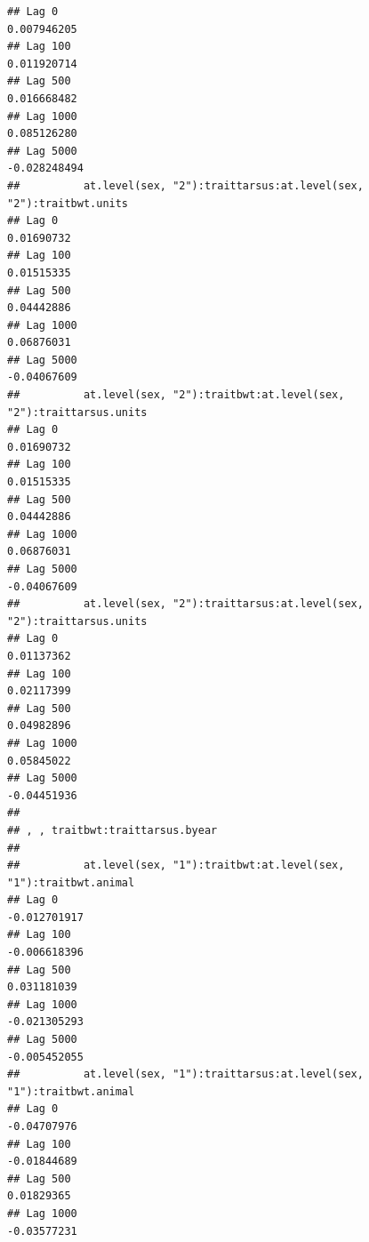 \documentclass[
  12pt,
]{book}
\begin{document}
\begin{verbatim}
## Lag 0                                                      0.007946205
## Lag 100                                                    0.011920714
## Lag 500                                                    0.016668482
## Lag 1000                                                   0.085126280
## Lag 5000                                                  -0.028248494
##          at.level(sex, "2"):traittarsus:at.level(sex, "2"):traitbwt.units
## Lag 0                                                          0.01690732
## Lag 100                                                        0.01515335
## Lag 500                                                        0.04442886
## Lag 1000                                                       0.06876031
## Lag 5000                                                      -0.04067609
##          at.level(sex, "2"):traitbwt:at.level(sex, "2"):traittarsus.units
## Lag 0                                                          0.01690732
## Lag 100                                                        0.01515335
## Lag 500                                                        0.04442886
## Lag 1000                                                       0.06876031
## Lag 5000                                                      -0.04067609
##          at.level(sex, "2"):traittarsus:at.level(sex, "2"):traittarsus.units
## Lag 0                                                             0.01137362
## Lag 100                                                           0.02117399
## Lag 500                                                           0.04982896
## Lag 1000                                                          0.05845022
## Lag 5000                                                         -0.04451936
## 
## , , traitbwt:traittarsus.byear
## 
##          at.level(sex, "1"):traitbwt:at.level(sex, "1"):traitbwt.animal
## Lag 0                                                      -0.012701917
## Lag 100                                                    -0.006618396
## Lag 500                                                     0.031181039
## Lag 1000                                                   -0.021305293
## Lag 5000                                                   -0.005452055
##          at.level(sex, "1"):traittarsus:at.level(sex, "1"):traitbwt.animal
## Lag 0                                                          -0.04707976
## Lag 100                                                        -0.01844689
## Lag 500                                                         0.01829365
## Lag 1000                                                       -0.03577231

\end{verbatim}
\end{document}
